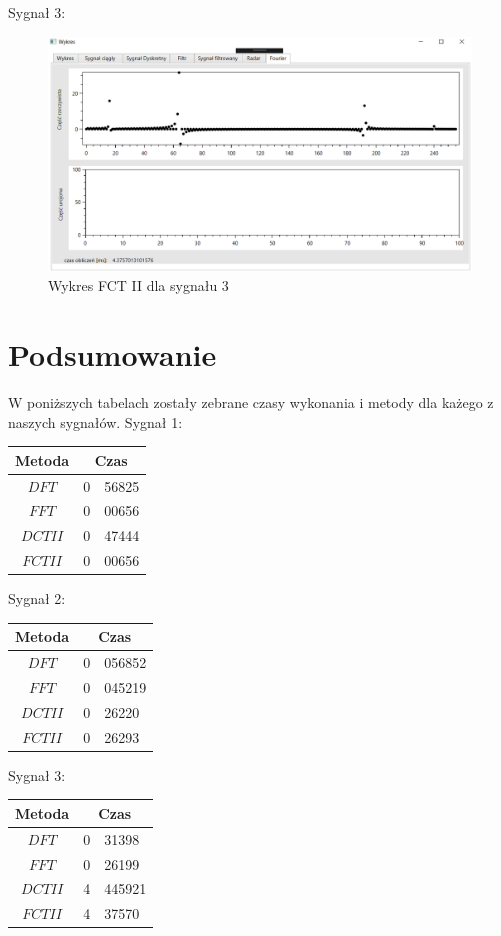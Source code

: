 \documentclass[12pt]{article}
\begin{document}
\newpage
Sygnał 3:
\begin{figure}[h!]
 \centering
 \includegraphics[width=12.3cm]{s18FCT2.PNG}
 \vspace{-0.3cm}
 \caption{Wykres FCT II dla sygnału 3}
 \label{Wykres dla wyników eksperymentu pierwszego}
\end{figure}


\section{Podsumowanie}
W poniższych tabelach zostały zebrane czasy wykonania i metody dla każego z naszych sygnałów.
Sygnał 1:
\begin{tabular}{c r @{,} l}
Metoda &
\multicolumn{2}{c}{Czas}\\ \hline
$DFT$ & 0&56825 \\
$FFT$ & 0&00656 \\
$DCT II$ & 0&47444 \\
$FCT II$ & 0&00656 \\
\end{tabular}

Sygnał 2:
\begin{tabular}{c r @{,} l}
Metoda &
\multicolumn{2}{c}{Czas}\\ \hline
$DFT$ & 0&056852 \\
$FFT$ & 0&045219 \\
$DCT II$ & 0&26220 \\
$FCT II$ & 0&26293 \\
\end{tabular}

Sygnał 3:
\begin{tabular}{c r @{,} l}
Metoda &
\multicolumn{2}{c}{Czas}\\ \hline
$DFT$ & 0&31398 \\
$FFT$ & 0&26199 \\
$DCT II$ & 4&445921 \\
$FCT II$ & 4&37570 \\
\end{tabular}
\end{document}
